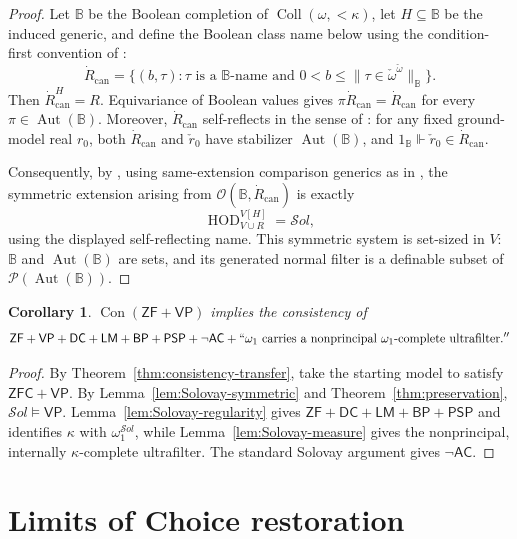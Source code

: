 \documentclass[11pt,a4paper]{amsart}
\newcommand{\VP}{\mathsf{VP}}
\newcommand{\AC}{\mathsf{AC}}
\newcommand{\ZF}{\mathsf{ZF}}
\newcommand{\ZFC}{\mathsf{ZFC}}
\newcommand{\Con}{\operatorname{Con}}
\newcommand{\HOD}{\operatorname{HOD}}
\newcommand{\Coll}{\operatorname{Coll}}
\newcommand{\Aut}{\operatorname{Aut}}
\newcommand{\DC}{\mathsf{DC}}
\newcommand{\LM}{\mathsf{LM}}
\newcommand{\BP}{\mathsf{BP}}
\newcommand{\PSP}{\mathsf{PSP}}
\theoremstyle{plain}
\newtheorem{corollary}[theorem]{Corollary}
\theoremstyle{definition}
\theoremstyle{remark}
\begin{document}
\begin{proof}
Let $\mathbb B$ be the Boolean completion of ${\Coll}(\omega,{<}\kappa)$, let $H\subseteq\mathbb B$ be the induced generic, and define the Boolean class name below using the condition-first convention of \cite{KaragilaSchilhan}:
\[
\dot R_{\mathrm{can}}=
\{(b,\tau):\tau\text{ is a }\mathbb B\text{-name and }
0<b\leq\|\tau\in\check\omega^{\check\omega}\|_{\mathbb B}\}.
\]
Then $\dot R_{\mathrm{can}}^H=R$.  Equivariance of Boolean values gives
$\pi\dot R_{\mathrm{can}}=\dot R_{\mathrm{can}}$ for every
$\pi\in\Aut(\mathbb B)$.  Moreover, $\dot R_{\mathrm{can}}$ self-reflects in the sense of \cite[Definitions~9.1--9.2]{KaragilaSchilhan}: for any fixed ground-model real $r_0$, both $\dot R_{\mathrm{can}}$ and $\check r_0$ have stabilizer $\Aut(\mathbb B)$, and
$1_{\mathbb B}\Vdash\check r_0\in\dot R_{\mathrm{can}}$.

Consequently, by \cite[Proposition~9.4]{KaragilaSchilhan}, using same-extension comparison generics as in \cite[Proposition~4.2]{Supplement}, the symmetric extension arising from
$\mathcal O(\mathbb B,\dot R_{\mathrm{can}})$ is exactly
\[
\HOD_{V\cup R}^{V[H]}=\mathcal S\!ol,
\]
using the displayed self-reflecting name.  This symmetric system is set-sized in $V$: $\mathbb B$ and $\Aut(\mathbb B)$ are sets, and its generated normal filter is a definable subset of
$\mathcal P(\Aut(\mathbb B))$.
\end{proof}

\begin{corollary}\label{cor:Solovay}
$\Con(\ZF+\VP)$ implies the consistency of
\[
\ZF+\VP+\DC+\LM+\BP+\PSP+\neg\AC+
``\omega_1\text{ carries a nonprincipal }\omega_1\text{-complete ultrafilter}.''
\]
\end{corollary}

\begin{proof}
By Theorem~\ref{thm:consistency-transfer}, take the starting model to satisfy $\ZFC+\VP$.  By Lemma~\ref{lem:Solovay-symmetric} and Theorem~\ref{thm:preservation},
$\mathcal S\!ol\models\VP$.  Lemma~\ref{lem:Solovay-regularity} gives $\ZF+\DC+\LM+\BP+\PSP$ and identifies $\kappa$ with $\omega_1^{\mathcal S\!ol}$, while Lemma~\ref{lem:Solovay-measure} gives the nonprincipal, internally $\kappa$-complete ultrafilter.  The standard Solovay argument gives $\neg\AC$.
\end{proof}

\begingroup

\section{{Limits of Choice restoration}}\label{sec:class-forcing}
\end{document}
